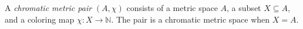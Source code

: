 
A \emph{chromatic metric pair} $(A,\chi)$ consists of a metric space $A$, a subset $X\subseteq A$, and a coloring map $\chi:X\to\mathbb N$. The pair is a chromatic metric space when $X=A$.
